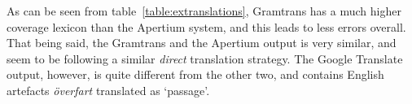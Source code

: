 \documentclass[11pt]{article}
\begin{document}
As can be seen from table~\ref{table:extranslations}, Gramtrans has a much higher coverage lexicon 
than the Apertium system, and this leads to less errors overall. That being said, the Gramtrans
and the Apertium output is very similar, and seem to be following a similar \emph{direct} translation strategy. The 
Google Translate output, however, is quite different from the other two, and contains English 
artefacts \emph{överfart} translated as `passage'. 


\end{document}
